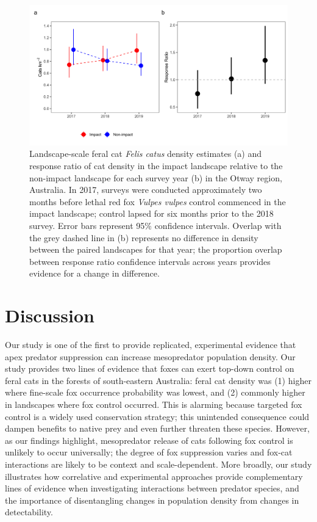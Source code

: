 \documentclass[11pt,a4paper,titlepage,twoside,openright]{style/unimelbthesis}
\begin{document}
\begin{mainmatter}
\begin{figure}
{\centering \includegraphics[width=1\linewidth]{figure/c3/otways_estimates_600dpi} 

}

\caption{Landscape-scale feral cat \textit{Felis catus} density estimates (a) and response ratio of cat density in the impact landscape relative to the non-impact landscape for each survey year (b) in the Otway region, Australia. In 2017, surveys were conducted approximately two months before lethal red fox \textit{Vulpes vulpes} control commenced in the impact landscape; control lapsed for six months prior to the 2018 survey. Error bars represent 95\% confidence intervals. Overlap with the grey dashed line in (b) represents no difference in density between the paired landscapes for that year; the proportion overlap between response ratio confidence intervals across years provides evidence for a change in difference.}\label{fig:diffo}
\end{figure}
\newpage

\hypertarget{discussion-3}{%
\section{Discussion}\label{discussion-3}}

Our study is one of the first to provide replicated, experimental evidence that apex predator suppression can increase mesopredator population density. Our study provides two lines of evidence that foxes can exert top-down control on feral cats in the forests of south-eastern Australia: feral cat density was (1) higher where fine-scale fox occurrence probability was lowest, and (2) commonly higher in landscapes where fox control occurred. This is alarming because targeted fox control is a widely used conservation strategy; this unintended consequence could dampen benefits to native prey and even further threaten these species. However, as our findings highlight, mesopredator release of cats following fox control is unlikely to occur universally; the degree of fox suppression varies and fox-cat interactions are likely to be context and scale-dependent. More broadly, our study illustrates how correlative and experimental approaches provide complementary lines of evidence when investigating interactions between predator species, and the importance of disentangling changes in population density from changes in detectability.


\end{mainmatter}
\end{document}
